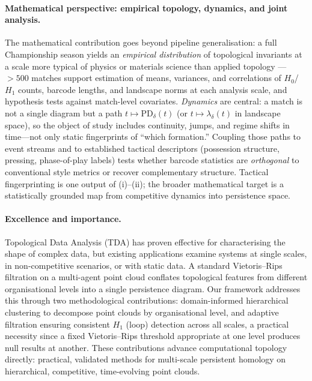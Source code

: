 \paragraph{Mathematical perspective: empirical topology, dynamics, and joint analysis.}
The mathematical contribution goes beyond pipeline generalisation: a full Championship season yields an \emph{empirical distribution} of topological invariants at a scale more typical of physics or materials science than applied topology --- $>500$ matches support estimation of means, variances, and correlations of $H_0$/$H_1$ counts, barcode lengths, and landscape norms at each analysis scale, and hypothesis tests against match-level covariates. \emph{Dynamics} are central: a match is not a single diagram but a path $t \mapsto \mathrm{PD}_\delta(t)$ (or $t \mapsto \lambda_\delta(t)$ in landscape space), so the object of study includes continuity, jumps, and regime shifts in time---not only static fingerprints of ``which formation.'' Coupling those paths to event streams and to established tactical descriptors (possession structure, pressing, phase-of-play labels) \citep{Memmert2017, Gudmundsson2017} tests whether barcode statistics are \emph{orthogonal} to conventional style metrics or recover complementary structure. Tactical fingerprinting is one output of (i)--(ii); the broader mathematical target is a statistically grounded map from competitive dynamics into persistence space.

\paragraph{Excellence and importance.}
Topological Data Analysis (TDA) has proven effective for characterising the shape of complex data, but existing applications examine systems at single scales, in non-competitive scenarios, or with static data. A standard Vietoris--Rips filtration on a multi-agent point cloud conflates topological features from different organisational levels into a single persistence diagram. Our framework addresses this through two methodological contributions: domain-informed hierarchical clustering to decompose point clouds by organisational level, and adaptive filtration ensuring consistent $H_1$ (loop) detection across all scales, a practical necessity since a fixed Vietoris--Rips threshold appropriate at one level produces null results at another. These contributions advance computational topology directly: practical, validated methods for multi-scale persistent homology on hierarchical, competitive, time-evolving point clouds.

